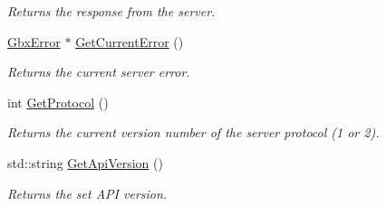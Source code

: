 \begin{DoxyCompactItemize}
\begin{DoxyCompactList}\small\item\em Returns the response from the server. \end{DoxyCompactList}\item 
\hyperlink{structGbxError}{Gbx\-Error} $\ast$ \hyperlink{classGbxRemote_a5467b5400129cd13239f88576aaaa2b4}{Get\-Current\-Error} ()
\begin{DoxyCompactList}\small\item\em Returns the current server error. \end{DoxyCompactList}\item 
\hypertarget{classGbxRemote_ae6e15060920a31482fd14045cfd42803}{int \hyperlink{classGbxRemote_ae6e15060920a31482fd14045cfd42803}{Get\-Protocol} ()}\label{classGbxRemote_ae6e15060920a31482fd14045cfd42803}

\begin{DoxyCompactList}\small\item\em Returns the current version number of the server protocol (1 or 2). \end{DoxyCompactList}\item 
\hypertarget{classGbxRemote_a6351f71fe649bff2aabfbd9b7c89e3f5}{std\-::string \hyperlink{classGbxRemote_a6351f71fe649bff2aabfbd9b7c89e3f5}{Get\-Api\-Version} ()}\label{classGbxRemote_a6351f71fe649bff2aabfbd9b7c89e3f5}

\begin{DoxyCompactList}\small\item\em Returns the set A\-P\-I version. \end{DoxyCompactList}\end{DoxyCompactItemize}
